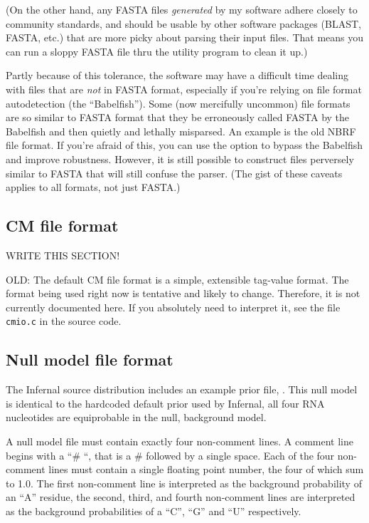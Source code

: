 (On the other hand, any FASTA files \emph{generated} by my software
adhere closely to community standards, and should be usable by other
software packages (BLAST, FASTA, etc.) that are more picky about
parsing their input files. That means you can run a sloppy FASTA file
thru the  utility program to clean it up.)

Partly because of this tolerance, the software may have a difficult
time dealing with files that are \textit{not} in FASTA format,
especially if you're relying on file format autodetection (the
``Babelfish'').  Some (now mercifully uncommon) file formats are so
similar to FASTA format that they be erroneously called FASTA by the
Babelfish and then quietly and lethally misparsed. An example is the
old NBRF file format. If you're afraid of this, you can use the
 option to bypass the Babelfish and improve
robustness. However, it is still possible to construct files
perversely similar to FASTA that will still confuse the parser.  (The
gist of these caveats applies to all formats, not just FASTA.)

\subsection{CM file format}

WRITE THIS SECTION!

OLD: 
The default CM file format is a simple, extensible tag-value format.
The format being used right now is tentative and likely to
change. Therefore, it is not currently documented here. If you
absolutely need to interpret it, see the file \verb+cmio.c+ in the
source code.

\subsection{Null model file format}

The Infernal source distribution includes an example prior file, 
. This null model is identical to the hardcoded default
prior used by Infernal, all four RNA nucleotides are equiprobable in
the null, background model. 

A null model file must contain exactly four non-comment lines. A
comment line begins with a ``\# ``, that is a \# followed by a single
space. Each of the four non-comment lines must contain a single floating point
number, the four of which sum to 1.0. The first non-comment line is interpreted as
the background probability of an ``A'' residue, the second, third, and
fourth non-comment lines are interpreted as the background
probabilities of a ``C'', ``G'' and ``U'' respectively. 





